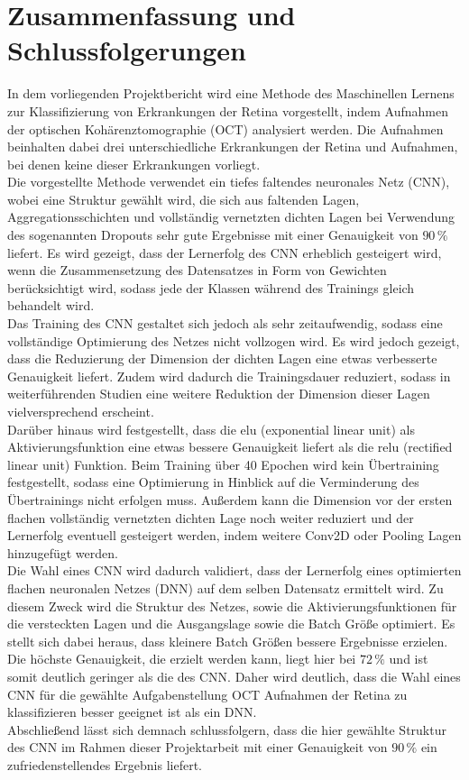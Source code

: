 \section{Zusammenfassung und Schlussfolgerungen}

In dem vorliegenden Projektbericht wird eine Methode des Maschinellen Lernens zur Klassifizierung von Erkrankungen der Retina vorgestellt, indem Aufnahmen der optischen Kohärenztomographie (OCT) analysiert werden. Die Aufnahmen beinhalten dabei drei unterschiedliche Erkrankungen der Retina und Aufnahmen, bei denen keine dieser Erkrankungen vorliegt.\\
Die vorgestellte Methode verwendet ein tiefes faltendes neuronales Netz (CNN), wobei eine Struktur gewählt wird, die sich aus faltenden Lagen, Aggregationsschichten und vollständig vernetzten dichten Lagen bei Verwendung des sogenannten Dropouts sehr gute Ergebnisse mit einer Genauigkeit von $90\,\%$ liefert. Es wird gezeigt, dass der Lernerfolg des CNN erheblich gesteigert wird, wenn die Zusammensetzung des Datensatzes in Form von Gewichten berücksichtigt wird, sodass jede der Klassen während des Trainings gleich behandelt wird. \\
Das Training des CNN gestaltet sich jedoch als sehr zeitaufwendig, sodass eine vollständige Optimierung des Netzes nicht vollzogen wird. Es wird jedoch gezeigt, dass die Reduzierung der Dimension der dichten Lagen eine etwas verbesserte Genauigkeit liefert. Zudem wird dadurch die Trainingsdauer reduziert, sodass in weiterführenden Studien eine weitere Reduktion der Dimension dieser Lagen vielversprechend erscheint. \\
Darüber hinaus wird festgestellt, dass die elu (exponential linear unit) als Aktivierungsfunktion eine etwas bessere Genauigkeit liefert als die relu (rectified linear unit) Funktion. Beim Training über 40 Epochen wird kein Übertraining festgestellt, sodass eine Optimierung in Hinblick auf die Verminderung des Übertrainings nicht erfolgen muss. Au{\ss}erdem kann die Dimension vor der ersten flachen vollständig vernetzten dichten Lage noch weiter reduziert und der Lernerfolg eventuell gesteigert werden, indem weitere Conv2D oder Pooling Lagen hinzugefügt werden. \\
Die Wahl eines CNN wird dadurch validiert, dass der Lernerfolg eines optimierten flachen neuronalen Netzes (DNN) auf dem selben Datensatz ermittelt wird. Zu diesem Zweck wird die Struktur des Netzes, sowie die Aktivierungsfunktionen für die versteckten Lagen und die Ausgangslage sowie die Batch Grö{\ss}e optimiert. Es stellt sich dabei heraus, dass kleinere Batch Grö{\ss}en bessere Ergebnisse erzielen. Die höchste Genauigkeit, die erzielt werden kann, liegt hier bei $72\,\%$ und ist somit deutlich geringer als die des CNN. Daher wird deutlich, dass die Wahl eines CNN für die gewählte Aufgabenstellung OCT Aufnahmen der Retina zu klassifizieren besser geeignet ist als ein DNN. \\
Abschlie{\ss}end lässt sich demnach schlussfolgern, dass die hier gewählte Struktur des CNN im Rahmen dieser Projektarbeit mit einer Genauigkeit von $90\,\%$ ein zufriedenstellendes Ergebnis liefert. \\
